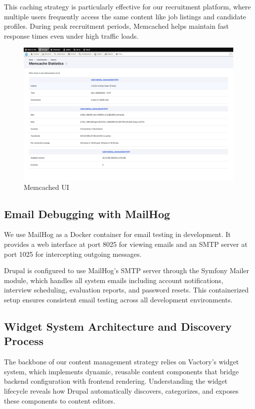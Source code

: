 This caching strategy is particularly effective for our recruitment platform, where multiple users frequently access the same content like job listings and candidate profiles. During peak recruitment periods, Memcached helps maintain fast response times even under high traffic loads.
\begin{figure}[H]
  \centering
  \includegraphics[width=\textwidth]{images/memcached_ui.png}
  \caption{Memcached UI}
  \label{fig:memcached}
\end{figure}

\subsection{Email Debugging with MailHog}
We use MailHog as a Docker container for email testing in development. It provides a web interface at port 8025 for viewing emails and an SMTP server at port 1025 for intercepting outgoing messages.

Drupal is configured to use MailHog's SMTP server through the Symfony Mailer module, which handles all system emails including account notifications, interview scheduling, evaluation reports, and password resets. This containerized setup ensures consistent email testing across all development environments.

\subsection{Widget System Architecture and Discovery Process}
\noindent
The backbone of our content management strategy relies on Vactory's widget system, which implements dynamic, reusable content components that bridge backend configuration with frontend rendering. Understanding the widget lifecycle reveals how Drupal automatically discovers, categorizes, and exposes these components to content editors.

